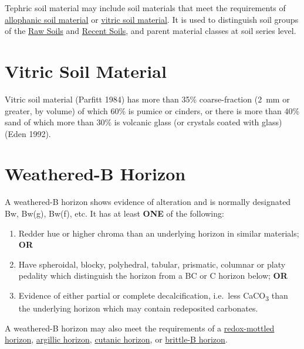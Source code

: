 \documentclass[
  letterpaper,
  DIV=11,
  numbers=noendperiod]{scrreprt}
\providecommand{\tightlist}{%
  \setlength{\itemsep}{0pt}\setlength{\parskip}{0pt}}\usepackage{longtable,booktabs,array}
\begin{document}
Tephric soil material may include soil materials that meet the
requirements of \protect\hyperlink{sec-diag-alloph}{allophanic soil
material} or \protect\hyperlink{sec-diag-vitr}{vitric soil material}. It
is used to distinguish soil groups of the
\protect\hyperlink{sec-ord-W}{Raw Soils} and
\protect\hyperlink{sec-ord-R}{Recent Soils}, and parent material classes
at soil series level.

\hypertarget{sec-diag-vitr}{%
\section{Vitric Soil Material}\label{sec-diag-vitr}}

Vitric soil material (Parfitt 1984) has more than 35\% coarse-fraction
(2~mm or greater, by volume) of which 60\% is pumice or cinders, or
there is more than 40\% sand of which more than 30\% is volcanic glass
(or crystals coated with glass) (Eden 1992).

\hypertarget{sec-diag-bw}{%
\section{Weathered-B Horizon}\label{sec-diag-bw}}

A weathered-B horizon shows evidence of alteration and is normally
designated Bw, Bw(g), Bw(f), etc. It has at least \textbf{ONE} of the
following:

\begin{enumerate}
\def\labelenumi{\arabic{enumi}.}
\tightlist
\item
  Redder hue or higher chroma than an underlying horizon in similar
  materials; \textbf{OR}
\item
  Have spheroidal, blocky, polyhedral, tabular, prismatic, columnar or
  platy pedality which distinguish the horizon from a BC or C horizon
  below; \textbf{OR}
\item
  Evidence of either partial or complete decalcification, i.e.~less
  CaCO\textsubscript{3} than the underlying horizon which may contain
  redeposited carbonates.
\end{enumerate}

A weathered-B horizon may also meet the requirements of a
\protect\hyperlink{sec-diag-roxh}{redox-mottled horizon},
\protect\hyperlink{sec-diag-argh}{argillic horizon},
\protect\hyperlink{sec-diag-cuth}{cutanic horizon}, or
\protect\hyperlink{sec-diag-britb}{brittle-B horizon}.

\end{document}
